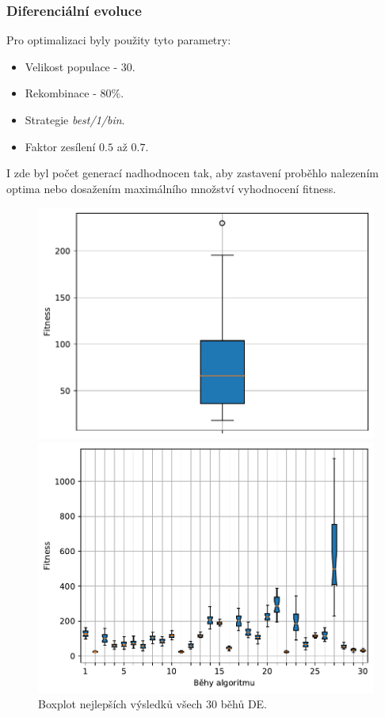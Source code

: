 \subsubsection{Diferenciální evoluce}
Pro optimalizaci byly použity tyto parametry:
\begin{itemize}
    \item Velikost populace - $30$.
    \item Rekombinace - $80\%$.
    \item Strategie \emph{best/1/bin}.
    \item Faktor zesílení $0.5$ až $0.7$.
\end{itemize}
I zde byl počet generací nadhodnocen tak, aby zastavení proběhlo nalezením optima nebo dosažením maximálního množství vyhodnocení fitness.

\begin{figure}[H]
\begin{minipage}[t]{0.475\linewidth}
\includegraphics[width=\linewidth]{obrazky-figures/statistics/Benchmarks/Rosenbrock/DE/bestsBoxplot_WithOutliers.pdf}
\caption{Boxplot nejlepších výsledků všech $30$ běhů DE.}
\label{fg:bench:rosenbrock:de:best}
\end{minipage}
\hfill
\begin{minipage}[t]{0.475\linewidth}
\includegraphics[width=\linewidth]{obrazky-figures/statistics/Benchmarks/Rosenbrock/DE/lastGenBoxplots.pdf}

\end{minipage}
\end{figure}
